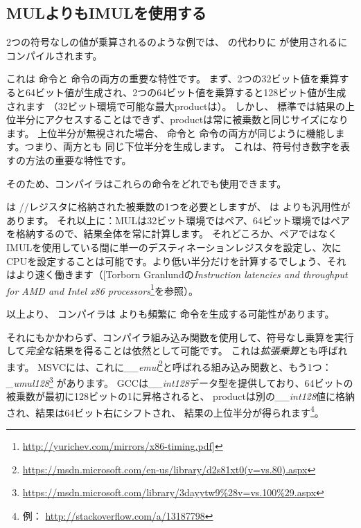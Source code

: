 ﻿\subsection{MULよりもIMULを使用する}
\label{IMUL_over_MUL}

2つの符号なしの値が乗算されるのような例では、 \MUL の代わりに \IMUL が使用されるにコンパイルされます。

これは \MUL 命令と \IMUL 命令の両方の重要な特性です。
まず、2つの32ビット値を乗算すると64ビット値が生成され、2つの64ビット値を乗算すると128ビット値が生成されます
（32ビット環境で可能な最大\gls{product}は）。
しかし、 \CCpp 標準では結果の上位半分にアクセスすることはできず、\gls{product}は常に被乗数と同じサイズになります。%
上位半分が無視された場合、 \MUL 命令と \IMUL 命令の両方が同じように機能します。つまり、両方とも
同じ下位半分を生成します。
これは、符号付き数字を表すの方法の重要な特性です。

そのため、\CCpp コンパイラはこれらの命令をどれでも使用できます。

\MUL は \AX/\EAX/\RAX レジスタに格納された被乗数の1つを必要としますが、 \IMUL は \MUL よりも汎用性があります。
それ以上に：MULは32ビット環境ではペア、64ビット環境ではペアを格納するので、結果全体を常に計算します。
それどころか、ペアではなくIMULを使用している間に単一のデスティネーションレジスタを設定し、次に\ac{CPU}を設定することは可能です。より低い半分だけを計算するでしょう、それはより速く働きます（[Torborn Granlundの\emph{Instruction latencies and throughput for AMD and Intel x86 processors}\footnote{\url{http://yurichev.com/mirrors/x86-timing.pdf}]}を参照）。

以上より、 \CCpp コンパイラは \MUL よりも頻繁に \IMUL 命令を生成する可能性があります。

それにもかかわらず、コンパイラ組み込み関数を使用して、符号なし乗算を実行して\emph{完全}な結果を得ることは依然として可能です。
これは\emph{拡張乗算}とも呼ばれます。 
MSVCには、これに\emph{\_\_emul}\footnote{\url{https://msdn.microsoft.com/en-us/library/d2s81xt0(v=vs.80).aspx}}と呼ばれる組み込み関数と、もう1つ：
\emph{\_umul128}\footnote{\url{https://msdn.microsoft.com/library/3dayytw9%28v=vs.100%29.aspx}} があります。 
GCCは\emph{\_\_int128}データ型を提供しており、64ビットの被乗数が最初に128ビットの1に昇格されると、
\gls{product}は別の\emph{\_\_int128}値に格納され、結果は64ビット右にシフトされ、
結果の上位半分が得られます\footnote{例： \url{http://stackoverflow.com/a/13187798}}。

